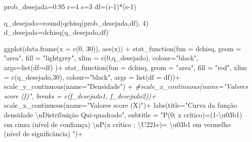 \documentclass[
]{book}
\newenvironment{Shaded}{\begin{snugshade}}{\end{snugshade}}
\newcommand{\AttributeTok}[1]{\textcolor[rgb]{0.77,0.63,0.00}{#1}}
\newcommand{\CommentTok}[1]{\textcolor[rgb]{0.56,0.35,0.01}{\textit{#1}}}
\newcommand{\DecValTok}[1]{\textcolor[rgb]{0.00,0.00,0.81}{#1}}
\newcommand{\FloatTok}[1]{\textcolor[rgb]{0.00,0.00,0.81}{#1}}
\newcommand{\FunctionTok}[1]{\textcolor[rgb]{0.00,0.00,0.00}{#1}}
\newcommand{\NormalTok}[1]{#1}
\newcommand{\OtherTok}[1]{\textcolor[rgb]{0.56,0.35,0.01}{#1}}
\newcommand{\SpecialCharTok}[1]{\textcolor[rgb]{0.00,0.00,0.00}{#1}}
\newcommand{\StringTok}[1]{\textcolor[rgb]{0.31,0.60,0.02}{#1}}
\begin{document}
\begin{Shaded}
\begin{Highlighting}[]
\NormalTok{prob\_desejada}\OtherTok{=}\FloatTok{0.95}
\NormalTok{r}\OtherTok{=}\DecValTok{4}
\NormalTok{s}\OtherTok{=}\DecValTok{3}
\NormalTok{df}\OtherTok{=}\NormalTok{(r}\DecValTok{{-}1}\NormalTok{)}\SpecialCharTok{*}\NormalTok{(s}\DecValTok{{-}1}\NormalTok{)}

\NormalTok{q\_desejado}\OtherTok{=}\FunctionTok{round}\NormalTok{(}\FunctionTok{qchisq}\NormalTok{(prob\_desejada,df), }\DecValTok{4}\NormalTok{)}
\NormalTok{d\_desejada}\OtherTok{=}\FunctionTok{dchisq}\NormalTok{(q\_desejado,df)}



\FunctionTok{ggplot}\NormalTok{(}\FunctionTok{data.frame}\NormalTok{(}\AttributeTok{x =} \FunctionTok{c}\NormalTok{(}\DecValTok{0}\NormalTok{, }\DecValTok{30}\NormalTok{)), }\FunctionTok{aes}\NormalTok{(x)) }\SpecialCharTok{+}
  \FunctionTok{stat\_function}\NormalTok{(}\AttributeTok{fun =}\NormalTok{ dchisq,}
                \AttributeTok{geom =} \StringTok{"area"}\NormalTok{,}
                \AttributeTok{fill =} \StringTok{"lightgrey"}\NormalTok{,}
                \AttributeTok{xlim =} \FunctionTok{c}\NormalTok{(}\DecValTok{0}\NormalTok{,q\_desejado),}
                \AttributeTok{colour=}\StringTok{"black"}\NormalTok{,}
                \AttributeTok{args=}\FunctionTok{list}\NormalTok{(}\AttributeTok{df=}\NormalTok{df) )}\SpecialCharTok{+}
  \FunctionTok{stat\_function}\NormalTok{(}\AttributeTok{fun =}\NormalTok{ dchisq,}
                \AttributeTok{geom =} \StringTok{"area"}\NormalTok{,}
                \AttributeTok{fill =} \StringTok{"red"}\NormalTok{,}
                \AttributeTok{xlim =} \FunctionTok{c}\NormalTok{(q\_desejado,}\DecValTok{30}\NormalTok{),}
                \AttributeTok{colour=}\StringTok{"black"}\NormalTok{,}
                \AttributeTok{args =} \FunctionTok{list}\NormalTok{(}\AttributeTok{df =}\NormalTok{ df))}\SpecialCharTok{+}
  \FunctionTok{scale\_y\_continuous}\NormalTok{(}\AttributeTok{name=}\StringTok{"Densidade"}\NormalTok{) }\SpecialCharTok{+}
  \CommentTok{\#scale\_x\_continuous(name="Valores score (f)", breaks = c(f\_desejado1, f\_desejado2))+  }
  \FunctionTok{scale\_x\_continuous}\NormalTok{(}\AttributeTok{name=}\StringTok{"Valores score (X)"}\NormalTok{)}\SpecialCharTok{+}  
  \FunctionTok{labs}\NormalTok{(}\AttributeTok{title=}\StringTok{"Curva da função densidade }\SpecialCharTok{\textbackslash{}n}\StringTok{Distribuição Qui{-}quadrado"}\NormalTok{, }
  \AttributeTok{subtitle =} \StringTok{"P(0; x crítico)=(1{-}\textbackslash{}u03b1) em cinza (nível de confiança) }\SpecialCharTok{\textbackslash{}n}\StringTok{P(x crítico ; \textbackslash{}U221e)= \textbackslash{}u03b1 em vermelho (nível de significância) "}\NormalTok{)}\SpecialCharTok{+}

\end{Highlighting}
\end{Shaded}
\end{document}

